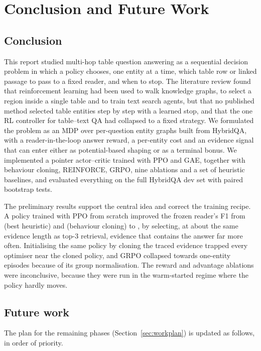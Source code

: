 \chapter{Conclusion and Future Work}
\label{ch:conclusion}

\section{Conclusion}

This report studied multi-hop table question answering as a sequential decision problem in which a policy chooses, one entity at a time, which table row or linked passage to pass to a fixed reader, and when to stop. The literature review found that reinforcement learning had been used to walk knowledge graphs, to select a region inside a single table and to train text search agents, but that no published method selected table entities step by step with a learned stop, and that the one RL controller for table--text QA had collapsed to a fixed strategy. We formulated the problem as an MDP over per-question entity graphs built from HybridQA, with a reader-in-the-loop answer reward, a per-entity cost and an evidence signal that can enter either as potential-based shaping or as a terminal bonus. We implemented a pointer actor--critic trained with PPO and GAE, together with behaviour cloning, REINFORCE, GRPO, nine ablations and a set of heuristic baselines, and evaluated everything on the full HybridQA dev set with paired bootstrap tests.

The preliminary results support the central idea and correct the training recipe. A policy trained with PPO from scratch improved the frozen reader's F1 from \fBmThree{} (best heuristic) and \fBc{} (behaviour cloning) to \fScratch{}, by selecting, at about the same evidence length as top-3 retrieval, evidence that contains the answer far more often. Initialising the same policy by cloning the traced evidence trapped every optimiser near the cloned policy, and GRPO collapsed towards one-entity episodes because of its group normalisation. The reward and advantage ablations were inconclusive, because they were run in the warm-started regime where the policy hardly moves.

\section{Future work}
\label{sec:future}

The plan for the remaining phases (Section~\ref{sec:workplan}) is updated as follows, in order of priority.

